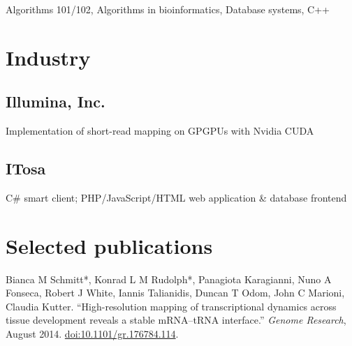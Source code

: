 \documentclass{klmr-cv}
\newcommand*\csharp{C\#}
\newcommand*\cpp{C++}
\begin{document}
\date{2008--2011}
\item{}
\item{Algorithms 101/102, Algorithms in bioinformatics, Database systems, \cpp}

\section{Industry}

\subsection{Illumina, Inc.}

\date{Oct 2008--Feb 2009}
\item{}
\item{Implementation of short-read mapping on GPGPUs with Nvidia CUDA}

\subsection{ITosa}

\date{Jan 2007--Jan 2008}
\item{}
\item{\csharp{} smart client; PHP/JavaScript/HTML web application \& database
    frontend}

\section{Selected publications}


\begin{enumerate}
    \listitem Bianca M Schmitt*, Konrad L M Rudolph*, Panagiota Karagianni,
        Nuno A Fonseca, Robert J White, Iannis Talianidis, Duncan T Odom,
        John C Marioni, Claudia Kutter. “High-resolution mapping of
        transcriptional dynamics across tissue development reveals a stable
        mRNA--tRNA interface.” \textit{Genome Research}, August 2014.
        \href{http://dx.doi.org/10.1101/gr.176784.114}{doi:10.1101/gr.176784.114}.
\end{enumerate}
\end{document}
